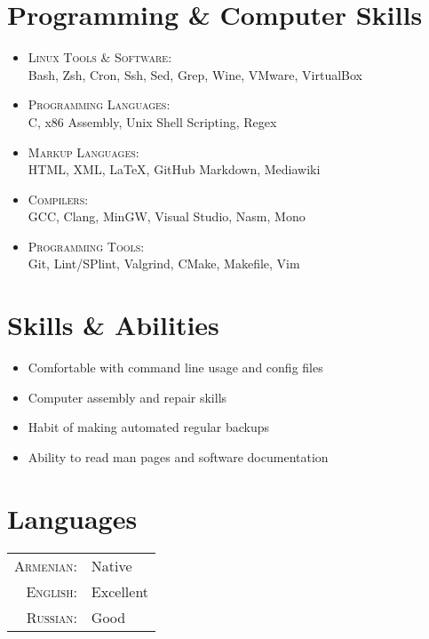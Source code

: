 \documentclass[a4paper,10pt]{article}
\begin{document}
\section{Programming \& Computer Skills}
\begin{itemize}
\item \textsc{Linux Tools \& Software}:\\
	Bash, Zsh, Cron, Ssh, Sed, Grep, Wine, VMware, VirtualBox
\item \textsc{Programming Languages}:\\
	C, x86 Assembly, Unix Shell Scripting, Regex
\item \textsc{Markup Languages}:\\
	HTML, XML, \LaTeX, GitHub Markdown, Mediawiki
\item \textsc{Compilers}:\\
	GCC, Clang, MinGW, Visual Studio, Nasm, Mono
\item \textsc{Programming Tools}:\\
	Git, Lint/SPlint, Valgrind, CMake, Makefile, Vim
\end{itemize}

\section{Skills \& Abilities}
\begin{itemize}
\item Comfortable with command line usage and config files
\item Computer assembly and repair skills
\item Habit of making automated regular backups
\item Ability to read man pages and software documentation
\end{itemize}

\section{Languages}
\begin{tabular}{r l}
\textsc{Armenian}: & Native\\
\textsc{English}: & Excellent\\
\textsc{Russian}: & Good
\end{tabular}
\end{document}
